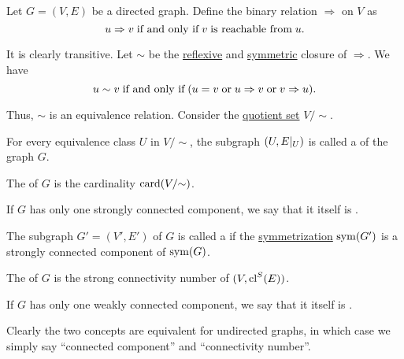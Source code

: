\begin{definition}\label{def:graph_connectedness}
  Let \( G = (V, E) \) be a directed graph. Define the binary relation \( \Rightarrow \) on \( V \) as
  \begin{equation*}
    u \Rightarrow v \T{if and only if} v \T{is reachable from} u.
  \end{equation*}

  It is clearly transitive. Let \( {\sim} \) be the \hyperref[def:derived_relations/reflexive]{reflexive} and \hyperref[def:derived_relations/symmetric]{symmetric} closure of \( \Rightarrow \). We have
  \begin{equation*}
    u \sim v \T{if and only if} (u = v \T{or} u \Rightarrow v \T{or} v \Rightarrow u).
  \end{equation*}

  Thus, \( \sim \) is an equivalence relation. Consider the \hyperref[def:equivalence_relation/quotient]{quotient set} \( V / {\sim} \).

  \begin{thmenum}
     For every equivalence class \( U \) in \( V / {\sim} \), the subgraph \( (U, E\vert_U) \) is called a  of the graph \( G \).

    The  of \( G \) is the cardinality \( \operatorname{card}(V / {\sim}) \).

    If \( G \) has only one strongly connected component, we say that it itself is .

     The subgraph \( G' = (V', E') \) of \( G \) is called a  if the \hyperref[def:graph/symmetrization]{symmetrization} \( \operatorname{sym}(G') \) is a strongly connected component of \( \operatorname{sym}(G) \).

    The  of \( G \) is the strong connectivity number of \( (V, \operatorname{cl}^S(E)) \).

    If \( G \) has only one weakly connected component, we say that it itself is .
  \end{thmenum}

  Clearly the two concepts are equivalent for undirected graphs, in which case we simply say \enquote{connected component} and \enquote{connectivity number}.
\end{definition}

